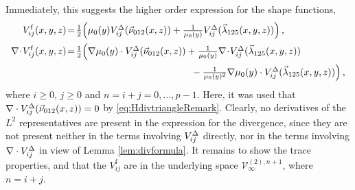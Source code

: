 Immediately, this suggests the higher order expression for the shape functions,
\begin{equation}
\begin{aligned}
	V_{ij}^\mathrm{f}(x,y,z)&\!=\!\textstyle{\frac{1}{2}}\Big(\mu_0(y)V_{ij}^\Tri(\vec{\nu}_{012}(x,z))
		+\textstyle{\frac{1}{\mu_0(y)}}V_{ij}^\Tri(\vec{\lambda}_{125}(x,y,z))\Big)\,,\\
	\nabla\!\cdot\! V_{ij}^\mathrm{f}(x,y,z)&\!=\!\textstyle{\frac{1}{2}}\Big(\nabla\mu_0(y)\cdot V_{ij}^\Tri(\vec{\nu}_{012}(x,z))
    	+\textstyle{\frac{1}{\mu_0(y)}}\nabla\!\cdot\!V_{ij}^\Tri(\vec{\lambda}_{125}(x,y,z))\\
    		&\qquad\qquad\qquad\qquad\qquad\qquad\quad
    			-\textstyle{\frac{1}{\mu_0(y)^2}}\nabla\mu_0(y)\cdot V_{ij}^\Tri(\vec{\lambda}_{125}(x,y,z))\Big)\,,
\end{aligned}
\label{eq:PyrHdivTriaFaceAppen}
\end{equation}
where $i\geq0$, $j\geq0$ and $n=i+j=0,\ldots,p-1$.
Here, it was used that $\nabla\cdot V_{ij}^\Delta(\vec{\nu}_{012}(x,z))=0$ by \eqref{eq:HdivtriangleRemark}.
Clearly, no derivatives of the $L^2$ representatives are present in the expression for the divergence, since they are not present neither in the terms involving $V_{ij}^\Delta$ directly, nor in the terms involving $\nabla\cdot V_{ij}^\Delta$ in view of Lemma \ref{lem:divformula}.
It remains to show the trace properties, and that the $V_{ij}^\mathrm{f}$ are in the underlying space $\mathcal{V}_\infty^{(2),n+1}$, where $n=i+j$.

